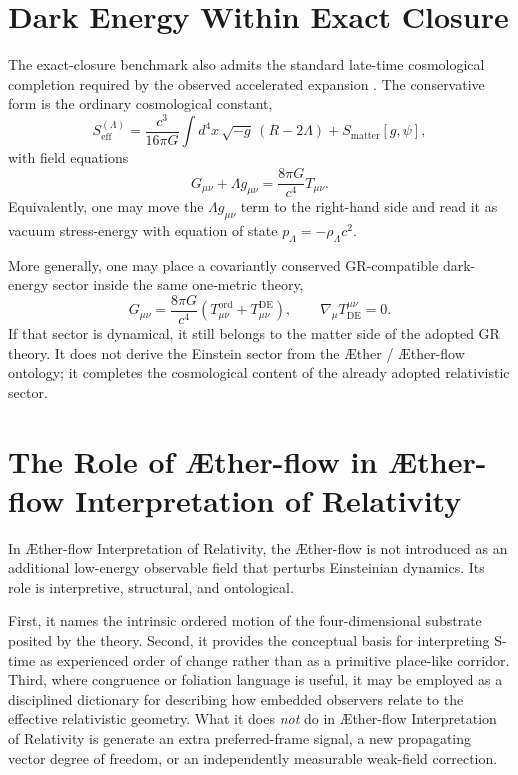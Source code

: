 \documentclass[11pt]{article}
\newcommand{\Aether}{\AE{}ther}
\newcommand{\Aflow}{\AE{}ther-flow}
\newcommand{\TheoryName}{\Aflow{} Interpretation of Relativity}
\begin{document}
\section{Dark Energy Within Exact Closure}

The exact-closure benchmark also admits the standard late-time cosmological completion required by the observed accelerated expansion \cite{Riess1998,Perlmutter1999,Planck2018Parameters}. The conservative form is the ordinary cosmological constant,
\begin{equation}
S_{\mathrm{eff}}^{(\Lambda)}
=
\frac{c^3}{16\pi G}\int d^4x\,\sqrt{-g}\,\left(R-2\Lambda\right)
+
S_{\mathrm{matter}}[g,\psi],
\label{eq:SA_lambda_note}
\end{equation}
with field equations
\begin{equation}
G_{\mu\nu}+\Lambda g_{\mu\nu}
=
\frac{8\pi G}{c^4}T_{\mu\nu}.
\label{eq:einstein_lambda_note}
\end{equation}
Equivalently, one may move the \(\Lambda g_{\mu\nu}\) term to the right-hand side and read it as vacuum stress-energy with equation of state \(p_{\Lambda}=-\rho_{\Lambda}c^2\).

More generally, one may place a covariantly conserved GR-compatible dark-energy sector inside the same one-metric theory,
\begin{equation}
G_{\mu\nu}
=
\frac{8\pi G}{c^4}\left(T_{\mu\nu}^{\mathrm{ord}}+T_{\mu\nu}^{\mathrm{DE}}\right),
\qquad
\nabla_\mu T_{\mathrm{DE}}^{\mu\nu}=0.
\label{eq:de_sector_note}
\end{equation}
If that sector is dynamical, it still belongs to the matter side of the adopted GR theory. It does not derive the Einstein sector from the \Aether{} / \Aflow{} ontology; it completes the cosmological content of the already adopted relativistic sector.

\section{The Role of \Aflow{} in \TheoryName{}}

In \TheoryName{}, the \Aflow{} is not introduced as an additional low-energy observable field that perturbs Einsteinian dynamics. Its role is interpretive, structural, and ontological.

First, it names the intrinsic ordered motion of the four-dimensional substrate posited by the theory. Second, it provides the conceptual basis for interpreting S-time as experienced order of change rather than as a primitive place-like corridor. Third, where congruence or foliation language is useful, it may be employed as a disciplined dictionary for describing how embedded observers relate to the effective relativistic geometry. What it does \emph{not} do in \TheoryName{} is generate an extra preferred-frame signal, a new propagating vector degree of freedom, or an independently measurable weak-field correction.
\end{document}
